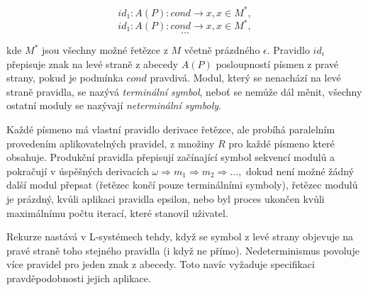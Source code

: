 \[id_1:A(P):cond\rightarrow x,x \in M^*,\]
\[id_1:A(P):cond\rightarrow x,x \in M^*,\]
\[\ldots\]

kde $M^*$ jsou všechny možné řetězce z $M$ včetně prázdného $\epsilon$. Pravidlo $id_i$ přepisuje znak na levé straně z abecedy $A(P)$ posloupností písmen z pravé strany, pokud je podmínka $cond$ pravdivá. Modul, který se nenachází na levé straně pravidla, se nazývá \textit{terminální symbol}, neboť se nemůže dál měnit, všechny ostatní moduly se nazývají \textit{neterminální symboly}.\cite{prusinkiewicz2012algorithmic}

Každé písmeno má vlastní pravidlo derivace řetězce, ale probíhá paralelním provedením aplikovatelných pravidel, z množiny $R$ pro každé písmeno které obsahuje. Produkční pravidla přepisují začínající symbol sekvencí modulů a pokračují v úspěšných derivacích $\omega \Rightarrow m_1 \Rightarrow m_2 \Rightarrow \ldots,$ dokud není možné žádný další modul přepsat (řetězec končí pouze terminálními symboly), řetězec modulů je prázdný, kvůli aplikaci pravidla epsilon, nebo byl proces ukončen kvůli maximálnímu počtu iterací, které stanovil uživatel.\cite{lindenmayer1968mathematical}

Rekurze nastává v L-systémech tehdy, když se symbol z levé strany objevuje na pravé straně toho stejného pravidla (i když ne přímo). Nedeterminismus povoluje více pravidel pro jeden znak z abecedy. Toto navíc vyžaduje specifikaci pravděpodobnosti jejich aplikace.\cite{lindenmayer1968mathematical}

